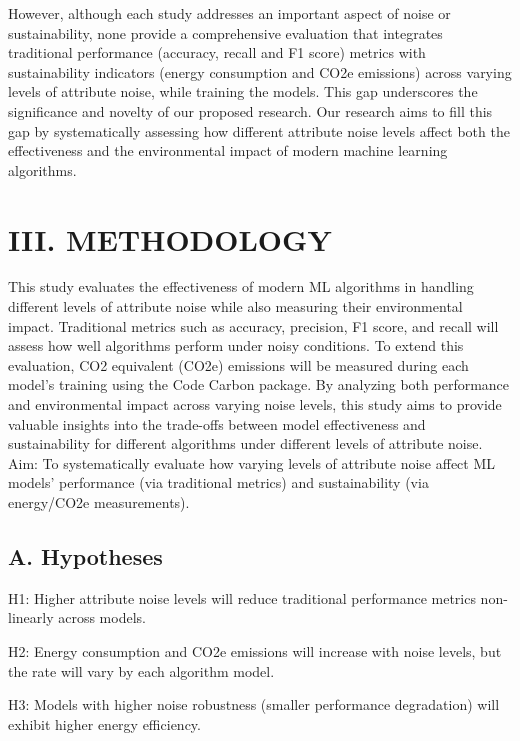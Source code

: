 \documentclass[conference]{IEEEtran}
\begin{document}
\newline
\newline
However, although each study addresses an important aspect of noise or sustainability, none provide a comprehensive evaluation that integrates traditional performance (accuracy, recall and F1 score) metrics with sustainability indicators (energy consumption and CO2e emissions) across varying levels of attribute noise, while training the models. This gap underscores the significance and novelty of our proposed research. Our research aims to fill this gap by systematically assessing how different attribute noise levels affect both the effectiveness and the environmental impact of modern machine learning algorithms.


\section*{III. METHODOLOGY}
This study evaluates the effectiveness of modern ML algorithms in handling different levels of attribute noise while also measuring their environmental impact. Traditional metrics such as accuracy, precision, F1 score, and recall will assess how well algorithms perform under noisy conditions. To extend this evaluation, CO2 equivalent (CO2e) emissions will be measured during each model's training using the Code Carbon package. By analyzing both performance and environmental impact across varying noise levels, this study aims to provide valuable insights into the trade-offs between model effectiveness and sustainability for different algorithms under different levels of attribute noise.
\newline
\newline
Aim: To systematically evaluate how varying levels of attribute noise affect ML models' performance (via traditional metrics) and sustainability (via energy/CO2e measurements).

\subsection*{A. Hypotheses}

\newline
\newline
\begin{itemize}[noitemsep, leftmargin=*]
    H1: Higher attribute noise levels will reduce traditional performance metrics non-linearly across models.
    \newline

    H2: Energy consumption and CO2e emissions will increase with noise levels, but the rate will vary by each algorithm model.
    \newline

    H3: Models with higher noise robustness (smaller performance degradation) will exhibit higher energy efficiency.
\end{itemize}
\end{document}
